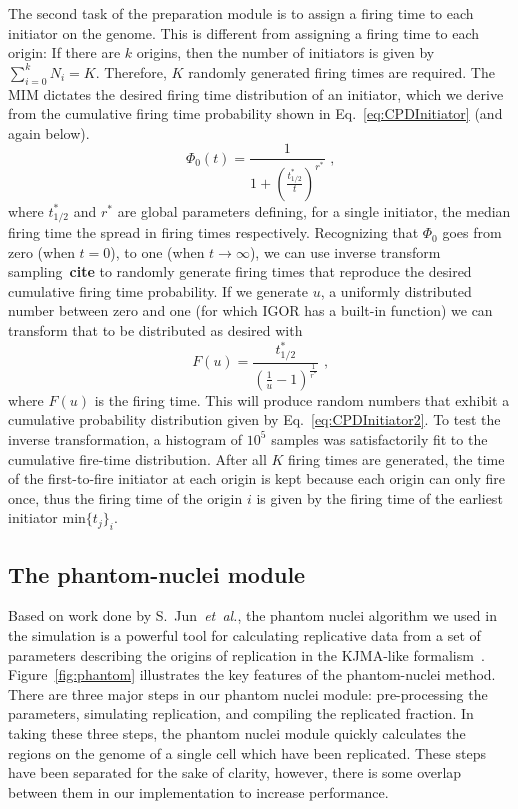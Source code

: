 		The second task of the preparation module is to assign a firing time to each initiator on the genome.
		This is different from assigning a firing time to each origin: If there are $k$ origins, then the number of initiators is given by $\sum\nolimits_{i=0}^k N_i = K$.
		Therefore, $K$ randomly generated firing times are required.
		The MIM dictates the desired firing time distribution of an initiator, which we derive from the cumulative firing time probability shown in Eq.~\ref{eq:CPDInitiator} (and again below).
		\begin{equation} \label{eq:CPDInitiator2}
			\Phi_0(t) = \frac{1}{1+\left(\frac{t^*_{1/2}}{t}\right)^{r^*}}\text{ ,}
		\end{equation}
		where $t^*_{1/2}$ and $r^*$ are global parameters defining, for a single initiator, the median firing time the spread in firing times respectively. 
		Recognizing that $\Phi_0$ goes from zero (when $t=0$), to one (when $t \rightarrow \infty$), we can use inverse transform sampling~\textbf{cite} to randomly generate firing times that reproduce the desired cumulative firing time probability.
		If we generate $u$, a uniformly distributed number between zero and one (for which IGOR has a built-in function) we can transform that to be distributed as desired with
		\begin{equation}
			F(u) = \frac{t^*_{1/2}}{\left(\frac{1}{u}-1\right)^\frac{1}{r^*}} \text{ ,}
		\end{equation}
		where $F(u)$ is the firing time.
		This will produce random numbers that exhibit a cumulative probability distribution given by Eq.~\ref{eq:CPDInitiator2}.
		To test the inverse transformation, a histogram of $10^5$ samples was satisfactorily fit to the cumulative fire-time distribution.
		After all $K$ firing times are generated, the time of the first-to-fire initiator at each origin is kept because each origin can only fire once, thus the firing time of the origin $i$ is given by the firing time of the earliest initiator $\text{min}\{t_j\}_i$.
		
		
		\subsection{The phantom-nuclei module}
		\label{subsec:PhanNuc}
		
		Based on work done by S.~Jun~\emph{et~al.}, the phantom nuclei algorithm we used in the simulation is a powerful tool for calculating replicative data from a set of parameters describing the origins of replication in the KJMA-like formalism~\cite{KJMA1}.
		Figure~\ref{fig:phantom} illustrates the key features of the phantom-nuclei method.
		There are three major steps in our phantom nuclei module: pre-processing the parameters, simulating replication, and compiling the replicated fraction.
		In taking these three steps, the phantom nuclei module quickly calculates the regions on the genome of a single cell which have been replicated.
		These steps have been separated for the sake of clarity, however, there is some overlap between them in our implementation to increase performance.
		
